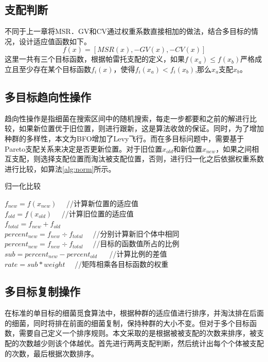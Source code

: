     \subsection{支配判断}
    不同于上一章将MSR．GV和CV通过权重系数直接相加的做法，结合多目标的情况，设计适应值函数如下。
    \begin{equation}
      f(x) = [MSR(x), -GV(x), -CV(x)]  
    \end{equation}
    这里一共有三个目标函数，根据帕雷托支配的定义，如果$f(x_a)\le f(x_b)$严格成立且至少存在某个目标函数$f_i(x)$，使得$f_i(x_a)<f_i(x_b)$,那么$x_a$支配$x_b$。
    
    \subsection{多目标趋向性操作}
    趋向性操作是指细菌在搜索区间中的随机搜索，每走一步都要和之前的解进行比较，如果新位置优于旧位置，则进行跟新，这是算法收敛的保证。同时，为了增加种群的多样性，本文为BFO增加了Levy飞行。而在多目标问题中，需要基于Pareto支配关系来决定是否更新位置。对于旧位置$x_{old}$和新位置$x_{new}$，如果之间相互支配，则选择支配位置而淘汰被支配位置，否则，进行归一化之后依据权重系数进行比较，如算法\ref{alg:norm}所示。

    \begin{algorithm}[htbp]
    \caption{归一化比较} \label{alg:norm}
    $f_{new} = f(x_{new})$　   //计算新位置的适应值\\
    $f_{old} = f(x_{old})$　 //计算旧位置的适应值\\
    $f_{total} = f_{new} + f_{old}$　   \\
    $percent_{new} = f_{new} \div f_{total}$　 //分别计算新旧个体中相同\\
    $percent_{new} = f_{new} \div f_{total}$　 //目标的函数值所占的比例\\
    $sub = percent_{new} - percent_{old}$ 　 //计算比例的差值\\
    $rate = sub \ast weight$　 //矩阵相乘各目标函数的权重\\
    \end{algorithm}

    \subsection{多目标复制操作}
    在标准的单目标的细菌觅食算法中，根据种群的适应值进行排序，并淘汰排在后面的细菌，同时将排在前面的细菌复制，保持种群的大小不变。但对于多个目标函数，需要自己定义一个排序规则。本文采取的是根据被被支配的次数来排序，被支配的次数越少则该个体越优。首先进行两两支配判断，然后统计出每个个体被支配的次数，最后根据次数排序。

